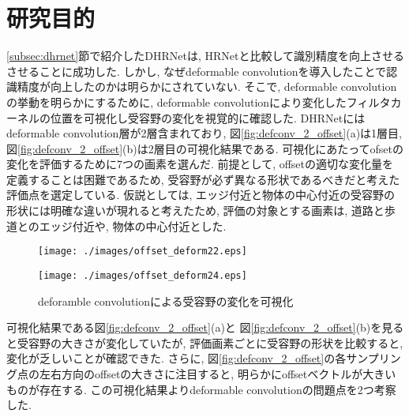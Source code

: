 \section{研究目的}\label{sec:mokuteki}
\ref{subsec:dhrnet}節で紹介したDHRNetは, HRNetと比較して識別精度を向上させるさせることに成功した. しかし, なぜdeformable convolutionを導入したことで認識精度が向上したのかは明らかにされていない. そこで, deformable convolutionの挙動を明らかにするために, deformable convolutionにより変化したフィルタカーネルの位置を可視化し受容野の変化を視覚的に確認した.
DHRNetにはdeformable convolution層が2層含まれており, 図\ref{fig:defconv_2_offset}(a)は1層目, 図\ref{fig:defconv_2_offset}(b)は2層目の可視化結果である. 可視化にあたってofsetの変化を評価するために7つの画素を選んだ. 前提として, offsetの適切な変化量を定義することは困難であるため, 受容野が必ず異なる形状であるべきだと考えた評価点を選定している. 仮説としては, エッジ付近と物体の中心付近の受容野の形状には明確な違いが現れると考えたため, 評価の対象とする画素は, 道路と歩道とのエッジ付近や, 物体の中心付近とした. \\
\begin{figure}[h]
    \begin{minipage}{0.5\hsize}
     \begin{center}
      \texttt{[image: ./images/offset\_deform22.eps]}
       \label{fig:defconv2_1_offset}
      \end{center}
    \end{minipage}
    \begin{minipage}{0.5\hsize}
     \begin{center}
      \texttt{[image: ./images/offset\_deform24.eps]}
      \label{fig:defconv2_2_offset}
      \end{center}
    \end{minipage}
    \caption{deforamble convolutionによる受容野の変化を可視化}
\end{figure} \label{fig:defconv_2_offset}
可視化結果である図\ref{fig:defconv_2_offset}(a)と 図\ref{fig:defconv_2_offset}(b)を見ると受容野の大きさが変化していたが, 評価画素ごとに受容野の形状を比較すると, 変化が乏しいことが確認できた. さらに, 図\ref{fig:defconv_2_offset}の各サンプリング点の左右方向のoffsetの大きさに注目すると, 明らかにoffsetベクトルが大きいものが存在する. この可視化結果よりdeformable convolutionの問題点を2つ考察した.
